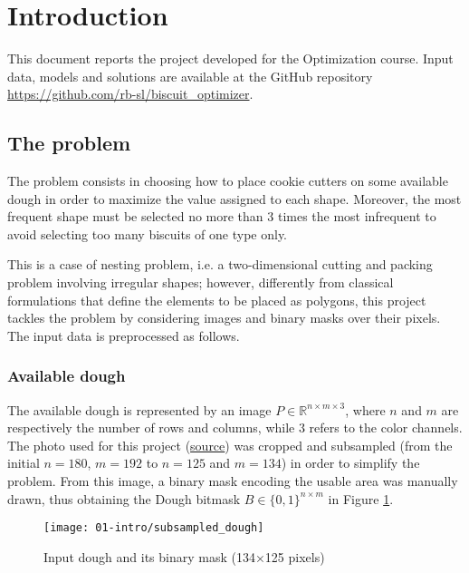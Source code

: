 
\section{Introduction}
This document reports the project developed for the Optimization course. Input data, models and solutions are available at the GitHub repository \href{https://github.com/rb-sl/biscuit_optimizer}{https://github.com/rb-sl/biscuit\_optimizer}.

\subsection{The problem}
The problem consists in choosing how to place cookie cutters on some available dough in order to maximize the value assigned to each shape. Moreover, the most frequent shape must be selected no more than 3 times the most infrequent to avoid selecting too many biscuits of one type only.

This is a case of nesting problem, i.e. a two-dimensional cutting and packing problem involving irregular shapes; however, differently from classical formulations that define the elements to be placed as polygons, this project tackles the problem by considering images and binary masks over their pixels. The input data is preprocessed as follows.

\subsubsection{Available dough}
The available dough is represented by an image $P \in \mathbb{R}^{n \times m \times 3}$, where $n$ and $m$ are respectively the number of rows and columns, while $3$ refers to the color channels. The photo used for this project (\href{https://www.buttalapasta.it/ricette/ricetta-biscotti-al-latte/25247/}{source}) was cropped and subsampled (from the initial $n=180$, $m=192$ to $n=125$ and $m=134$) in order to simplify the problem. From this image, a binary mask encoding the usable area was manually drawn, thus obtaining the Dough bitmask $B \in \{0, 1\}^{n \times m}$ in Figure \ref{fig:input_dough}.

\begin{figure}[H]
	\centering	
	\texttt{[image: 01-intro/subsampled\_dough]}
	\caption{Input dough and its binary mask (134×125 pixels)}
	\label{fig:input_dough}
\end{figure}

